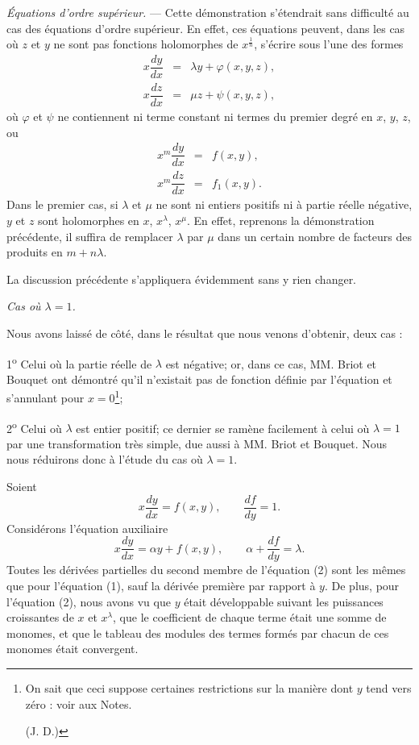 \documentclass[11pt]{article}
\begin{document}
\emph{Équations d’ordre supérieur.} — Cette démonstration s’étendrait sans difficulté au cas des équations d’ordre supérieur. En effet, ces équations peuvent, dans les cas où $z$ et $y$ ne sont pas fonctions holomorphes de $x^{\frac1n}$, s’écrire sous l’une des formes
\[
\begin{array}{rcl}
x\dfrac{dy}{dx}&=&\lambda y+\varphi(x,y,z),\\[0.5em]
x\dfrac{dz}{dx}&=&\mu z+\psi(x,y,z),
\end{array}
\]
où $\varphi$ et $\psi$ ne contiennent ni terme constant ni termes du premier degré en $x$, $y$, $z$, ou
\[
\begin{array}{rcl}
x^m\dfrac{dy}{dx}&=&f(x,y),\\[0.5em]
x^m\dfrac{dz}{dx}&=&f_1(x,y).
\end{array}
\]
Dans le premier cas, si $\lambda$ et $\mu$ ne sont ni entiers positifs ni à partie réelle négative, $y$ et $z$ sont holomorphes en $x$, $x^\lambda$, $x^\mu$. En effet, reprenons la démonstration précédente, il suffira de remplacer $\lambda$ par $\mu$ dans un certain nombre de facteurs des produits en $m+n\lambda$.

La discussion précédente s’appliquera évidemment sans y rien changer.

\begin{center}
\emph{Cas où $\lambda=1$.}
\end{center}

Nous avons laissé de côté, dans le résultat que nous venons d’obtenir, deux cas :

1\textsuperscript{o} Celui où la partie réelle de $\lambda$ est négative; or, dans ce cas, MM. Briot et Bouquet ont démontré qu’il n’existait pas de fonction définie par l’équation et s’annulant pour $x=0$\footnote[1]{On sait que ceci suppose certaines restrictions sur la manière dont $y$ tend vers zéro : voir aux Notes.\par\hfill (J. D.)};

2\textsuperscript{o} Celui où $\lambda$ est entier positif; ce dernier se ramène facilement à celui où $\lambda=1$ par une transformation très simple, due aussi à MM. Briot et Bouquet. Nous nous réduirons donc à l’étude du cas où $\lambda=1$.

Soient
\begin{equation*}\tag{1}
x\frac{dy}{dx}=f(x,y),\qquad \frac{df}{dy}=1.
\end{equation*}
Considérons l’équation auxiliaire
\begin{equation*}\tag{2}
x\frac{dy}{dx}=\alpha y+f(x,y),\qquad \alpha+\frac{df}{dy}=\lambda.
\end{equation*}
Toutes les dérivées partielles du second membre de l’équation (2) sont les mêmes que pour l’équation (1), sauf la dérivée première par rapport à $y$. De plus, pour l’équation (2), nous avons vu que $y$ était développable suivant les puissances croissantes de $x$ et $x^\lambda$, que le coefficient de chaque terme était une somme de monomes, et que le tableau des modules des termes formés par chacun de ces monomes était convergent.
\end{document}
